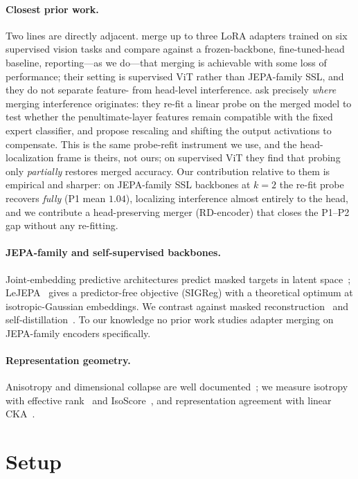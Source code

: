 \documentclass{article}
\begin{document}
\paragraph{Closest prior work.} Two lines are directly adjacent.
\citet{kesim2024multilora} merge up to three LoRA adapters trained on six
supervised vision tasks and compare against a frozen-backbone,
fine-tuned-head baseline, reporting---as we do---that merging is achievable
with some loss of performance; their setting is supervised ViT rather than
JEPA-family SSL, and they do not separate feature- from head-level
interference. \citet{sharma2024nonlocal} ask precisely \emph{where} merging
interference originates: they re-fit a linear probe on the merged model to
test whether the penultimate-layer features remain compatible with the fixed
expert classifier, and propose rescaling and shifting the output activations
to compensate. This is the same probe-refit instrument we use, and the
head-localization frame is theirs, not ours; on supervised ViT they find that
probing only \emph{partially} restores merged accuracy. Our contribution
relative to them is empirical and sharper: on JEPA-family SSL backbones at
$k{=}2$ the re-fit probe recovers \emph{fully} (P1 mean $1.04$), localizing
interference almost entirely to the head, and we contribute a head-preserving
merger (RD-encoder) that closes the P1--P2 gap without any re-fitting.
\paragraph{JEPA-family and self-supervised backbones.} Joint-embedding
predictive architectures predict masked targets in latent
space~\cite{assran2023ijepa,assran2025vjepa2}; LeJEPA~\cite{balestriero2025lejepa}
gives a predictor-free objective (SIGReg) with a theoretical optimum at
isotropic-Gaussian embeddings. We contrast against masked
reconstruction~\cite{he2022mae} and self-distillation~\cite{oquab2024dinov2}.
To our knowledge no prior work studies adapter merging on JEPA-family
encoders specifically.
\paragraph{Representation geometry.} Anisotropy and dimensional collapse are
well documented~\cite{gao2019degeneration}; we measure isotropy with effective
rank~\cite{roy2007erank} and IsoScore~\cite{rudman2022isoscore}, and
representation agreement with linear CKA~\cite{kornblith2019cka}.

\section{Setup}
\end{document}
